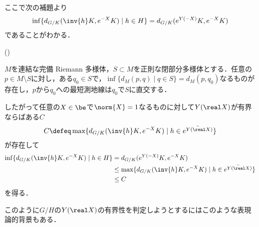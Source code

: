 ここで次の補題より
\begin{align*}
\inf\{d_{G/K}(\inv{h}K,  e^{-X}K)\mid h\in H \} = d_{G/K}(e^{Y(-X)}K, e^{-X} K)
\end{align*}
であることがわかる．
\begin{lem*}(\cite[p. 190]{lee2018})%
  
  $M$を連結な完備 Riemann 多様体，$S\subset M$を正則な閉部分多様体とする．任意の$p\in M\setminus S$に対し，ある$q_0\in S$で，$\inf\{d_M(p,q)\mid q\in S \} = d_M(p,q_0) $なるものが存在し，$p$から$q_0$への最短測地線は$q_0$で$S$に直交する．
\end{lem*}

したがって任意の$X\in \be $で$\norm{X} = 1 $なるものに対して$Y(\real X) $が有界ならばある$C $
\begin{align*}
  C\defeq \max\{d_{G/K} (\inv{h}K, e^{-X} K)\mid h\in \bar{e^{Y(\real X)}} \}
\end{align*}
が存在して
\begin{align*}
  \inf\{d_{G/K}(\inv{h}K,  e^{-X} K)\mid h\in H \} &= d_{G/K}(e^{Y(-X)}K, e^{-X} K)\\
                                                   &\leq \max\{d_{G/K} (\inv{h}K, e^{-X} K)\mid h\in \bar{e^{Y(\real X)}} \} \\
  &\leq C
\end{align*}
を得る．

このように$G/H$の$Y(\real X) $の有界性を判定しようとするにはこのような表現論的背景もある．
